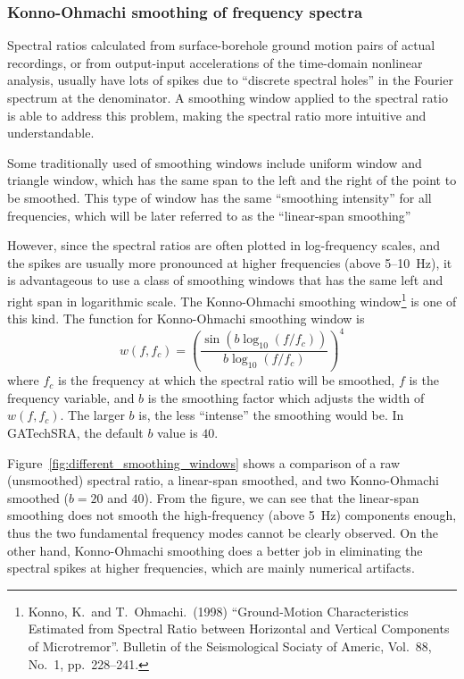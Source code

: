 \documentclass[11pt,letterpaper]{article}
\begin{document}
\subsubsection{Konno-Ohmachi smoothing of frequency spectra}\label{sec:konno-ohmachi}

Spectral ratios calculated from surface-borehole ground motion pairs of actual recordings, or from output-input accelerations of the time-domain nonlinear analysis, usually have lots of spikes due to ``discrete spectral holes'' in the Fourier spectrum at the denominator. A smoothing window applied to the spectral ratio is able to address this problem, making the spectral ratio more intuitive and understandable.

Some traditionally used of smoothing windows include uniform window and triangle window, which has the same span to the left and the right of the point to be smoothed. This type of window has the same ``smoothing intensity'' for all frequencies, which will be later referred to as the ``linear-span smoothing''

 However, since the spectral ratios are often plotted in log-frequency scales, and the spikes are usually more pronounced at higher frequencies (above 5--10~Hz), it is advantageous to use a class of smoothing windows that has the same left and right span in logarithmic scale. The Konno-Ohmachi smoothing window\footnote{Konno, K.~and T.~Ohmachi.~(1998) ``Ground-Motion Characteristics Estimated from Spectral Ratio between Horizontal and Vertical Components of Microtremor''. Bulletin of the Seismological Sociaty of Americ, Vol.~88, No.~1, pp.~228--241.} is one of this kind. The function for Konno-Ohmachi smoothing window is
\begin{equation}\label{eq:konno-ohmachi}
	w(f,f_c) = \left(   \frac{ \sin\left(  b\log_{10}(f/f_c)  \right) }{ b\log_{10}(f/f_c) }   \right)^4
\end{equation}
where $f_c$ is the frequency at which the spectral ratio will be smoothed, $f$ is the frequency variable, and $b$ is the smoothing factor which adjusts the width of $w(f,f_c)$. The larger $b$ is, the less ``intense'' the smoothing would be. In GATechSRA, the default $b$ value is $40$.

Figure~\ref{fig:different_smoothing_windows} shows a comparison of a raw (unsmoothed) spectral ratio, a linear-span smoothed, and two Konno-Ohmachi smoothed ($b=20$ and $40$). From the figure, we can see that the linear-span smoothing does not smooth the high-frequency (above 5~Hz) components enough, thus the two fundamental frequency modes cannot be clearly observed. On the other hand, Konno-Ohmachi smoothing does a better job in eliminating the spectral spikes at higher frequencies, which are mainly numerical artifacts.
\end{document}
